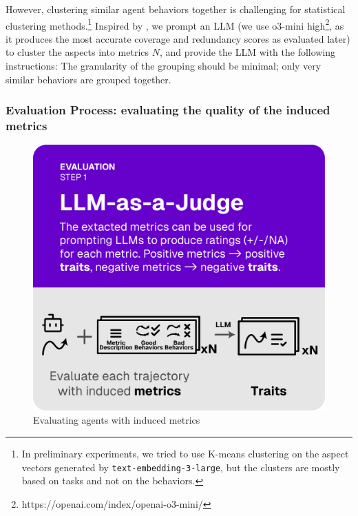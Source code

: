 However, clustering similar agent behaviors together is challenging for statistical clustering methods.\footnote{
    In preliminary experiments, we tried to use K-means clustering on the aspect vectors generated by \texttt{text-embedding-3-large},
    but the clusters are mostly based on tasks and not on the behaviors.
}
Inspired by \citet{viswanathan2024large,lam2024concept}, we prompt an LLM
(we use o3-mini high\footnote{https://openai.com/index/openai-o3-mini/}, as it produces the most accurate coverage and redundancy scores as evaluated later) to cluster the aspects into metrics $N$, and provide the LLM with the following instructions:
The granularity of the grouping should be minimal; only very similar behaviors are grouped together.


\subsubsection{Evaluation Process: evaluating the quality of the induced metrics}
\label{sec:evaluation_process}
\begin{figure}
  \vspace{-15pt}
  \includegraphics[width=\linewidth]{figs/autolibra_step_3.pdf}
  \vspace{-10pt}
  \caption{\small Evaluating agents with induced metrics}
  \label{fig:llm_as_a_judge}
\end{figure}
